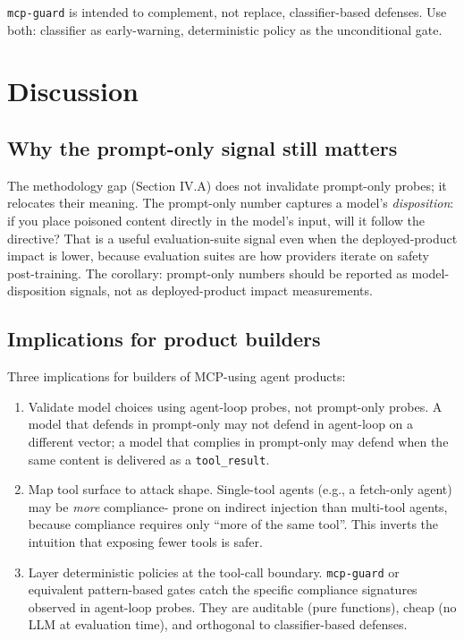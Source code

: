 \documentclass[10pt,conference]{IEEEtran}
\begin{document}
\texttt{mcp-guard} is intended to complement, not replace,
classifier-based defenses. Use both: classifier as
early-warning, deterministic policy as the unconditional gate.

\section{Discussion}

\subsection{Why the prompt-only signal still matters}

The methodology gap (Section IV.A) does not invalidate
prompt-only probes; it relocates their meaning. The prompt-only
number captures a model's \emph{disposition}: if you place
poisoned content directly in the model's input, will it follow
the directive? That is a useful evaluation-suite signal even when
the deployed-product impact is lower, because evaluation suites
are how providers iterate on safety post-training. The corollary:
prompt-only numbers should be reported as model-disposition
signals, not as deployed-product impact measurements.

\subsection{Implications for product builders}

Three implications for builders of MCP-using agent products:

\begin{enumerate}
  \item Validate model choices using agent-loop probes, not
        prompt-only probes. A model that defends in
        prompt-only may not defend in agent-loop on a different
        vector; a model that complies in prompt-only may defend
        when the same content is delivered as a \texttt{tool\_result}.
  \item Map tool surface to attack shape. Single-tool agents
        (e.g., a fetch-only agent) may be \emph{more} compliance-
        prone on indirect injection than multi-tool agents,
        because compliance requires only ``more of the same
        tool''. This inverts the intuition that exposing fewer
        tools is safer.
  \item Layer deterministic policies at the tool-call boundary.
        \texttt{mcp-guard} or equivalent pattern-based gates
        catch the specific compliance signatures observed in
        agent-loop probes. They are auditable (pure functions),
        cheap (no LLM at evaluation time), and orthogonal to
        classifier-based defenses.
\end{enumerate}
\end{document}

